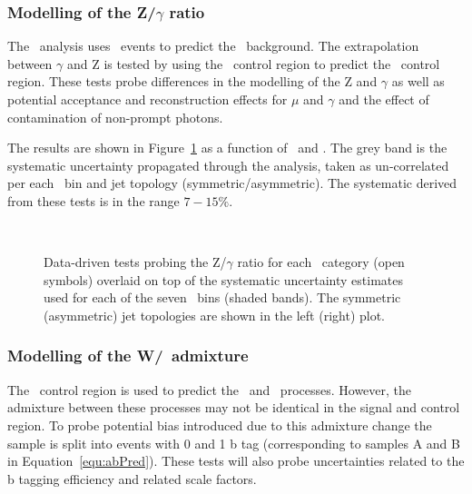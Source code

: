 \subsubsection{Modelling of the Z/$\gamma$ ratio}

The \alphat~analysis uses \gj~events to predict the \znunu~background. The extrapolation 
between $\gamma$ and Z is tested by using the \gj~control region to predict the \mmj~control region.
These tests probe differences in the modelling of the Z and $\gamma$ as well as potential acceptance and
reconstruction effects for $\mu$ and $\gamma$ and the effect of contamination of non-prompt photons.

The results are shown in Figure~\ref{fig:closurePhoToMuMu} as a function of \scalht~and \njet. 
The grey band is the systematic uncertainty propagated through the analysis, 
taken as un-correlated per each \scalht~bin and jet topology (symmetric/asymmetric). The systematic derived from these tests is
in the range $7-15\%$.


\begin{figure}[h!]
  \begin{center}
    ~~
    \caption{Data-driven tests probing the Z/$\gamma$ ratio for each
      \njet~category (open symbols) overlaid on top of the systematic
      uncertainty estimates used for each of the seven \scalht~bins
      (shaded bands). 
      The symmetric (asymmetric) jet topologies are shown in the left (right) plot.      
    }
    \label{fig:closurePhoToMuMu}
  \end{center} 
\end{figure}

\subsubsection{Modelling of the W/\ttbar~admixture}

The \mj~control region is used to predict the \wj~and \ttbar~processes. However, the admixture
between these processes may not be identical in the signal and control region.
To probe potential bias introduced due to this admixture change the sample is split into events with
0 and 1 b tag (corresponding to samples A and B in Equation~\ref{equ:abPred}). These tests will also probe 
uncertainties related to the b tagging efficiency and related scale factors. 


